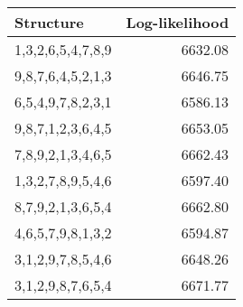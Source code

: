 \begin{tabular}{lr}
  \hline
Structure & Log-likelihood \\ 
  \hline
1,3,2,6,5,4,7,8,9 & 6632.08 \\ 
  9,8,7,6,4,5,2,1,3 & 6646.75 \\ 
  6,5,4,9,7,8,2,3,1 & 6586.13 \\ 
  9,8,7,1,2,3,6,4,5 & 6653.05 \\ 
  7,8,9,2,1,3,4,6,5 & 6662.43 \\ 
  1,3,2,7,8,9,5,4,6 & 6597.40 \\ 
  8,7,9,2,1,3,6,5,4 & 6662.80 \\ 
  4,6,5,7,9,8,1,3,2 & 6594.87 \\ 
  3,1,2,9,7,8,5,4,6 & 6648.26 \\ 
  3,1,2,9,8,7,6,5,4 & 6671.77 \\ 
   \hline
\end{tabular}
